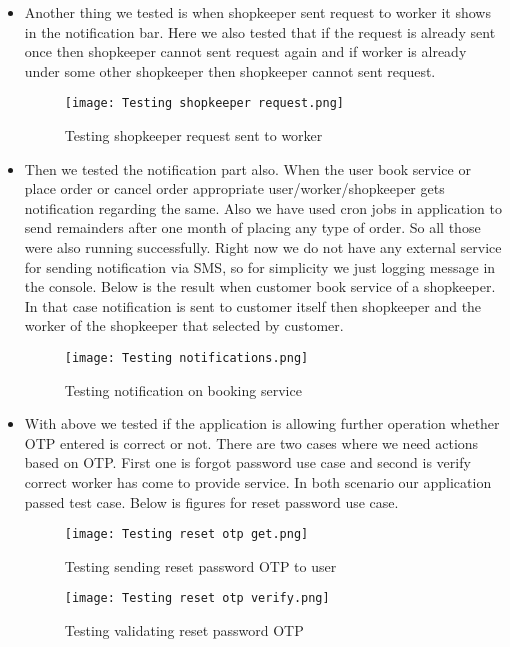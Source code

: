 \documentclass[conference]{IEEEtran}
\begin{document}
\begin{itemize}
    \item Another thing we tested is when shopkeeper sent request to worker it shows in the notification bar. Here we also tested that if the request is already sent once then shopkeeper cannot sent request again and if worker is already under some other shopkeeper then shopkeeper cannot sent request.
    \begin{figure}[H]
        \centering
        \texttt{[image: Testing shopkeeper request.png]}
        \caption{Testing shopkeeper request sent to worker}
        \label{fig:testShopkeeperRequest}
    \end{figure}
    
    \item Then we tested the notification part also. When the user book service or place order or cancel order appropriate user/worker/shopkeeper gets notification regarding the same. Also we have used cron jobs in application to send remainders after one month of placing any type of order. So all those were also running successfully. Right now we do not have any external service for sending notification via SMS, so for simplicity we just logging message in the console. Below is the result when customer book service of a shopkeeper. In that case notification is sent to customer itself then shopkeeper and the worker of the shopkeeper that selected by customer.
    \begin{figure}[H]
        \centering
        \texttt{[image: Testing notifications.png]}
        \caption{Testing notification on booking service}
        \label{fig:testNotification}
    \end{figure}
    
    \item With above we tested if the application is allowing further operation whether OTP entered is correct or not. There are two cases where we need actions based on OTP. First one is forgot password use case and second is verify correct worker has come to provide service. In both scenario our application passed test case. Below is figures for reset password use case.
    \begin{figure}[H]
        \centering
        \texttt{[image: Testing reset otp get.png]}
        \caption{Testing sending reset password OTP to user}
        \label{fig:testResetPasswordGet}
    \end{figure}
    \begin{figure}[H]
        \centering
        \texttt{[image: Testing reset otp verify.png]}
        \caption{Testing validating reset password OTP}
        \label{fig:testResetPasswordVerify}
    \end{figure}
    

\end{itemize}
\end{document}
